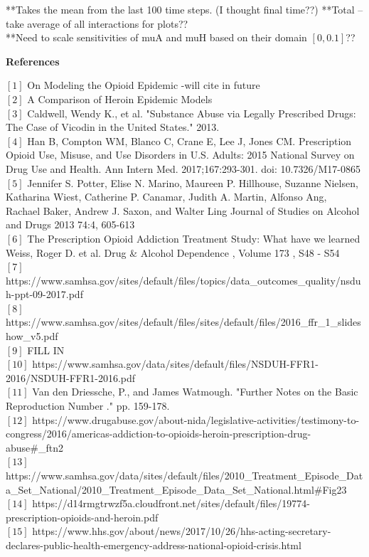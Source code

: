 \documentclass[12pt]{article}
\begin{document}
**Takes the mean from the last 100 time steps. (I thought final time??) 
**Total --take average of all interactions for plots?? \\
**Need to scale sensitivities of muA and muH based on their domain $[0,0.1]$??









\textbf{References}

$[1]$ On Modeling the Opioid Epidemic -will cite in future \\
$[2]$ A Comparison of Heroin Epidemic Models \\
$[3]$ Caldwell, Wendy K., et al. "Substance Abuse via Legally Prescribed Drugs: The Case of Vicodin in the United States." 2013. \\
$[4]$ Han B, Compton WM, Blanco C, Crane E, Lee J, Jones CM. Prescription Opioid Use, Misuse, and Use Disorders in U.S. Adults: 2015 National Survey on Drug Use and Health. Ann Intern Med. 2017;167:293-301. doi: 10.7326/M17-0865 \\
$[5]$  Jennifer S. Potter, Elise N. Marino, Maureen P. Hillhouse, Suzanne Nielsen, Katharina Wiest, Catherine P. Canamar, Judith A. Martin, Alfonso Ang, Rachael Baker, Andrew J. Saxon, and Walter Ling
Journal of Studies on Alcohol and Drugs 2013 74:4, 605-613 \\
$[6]$ The Prescription Opioid Addiction Treatment Study: What have we learned Weiss, Roger D. et al. Drug \& Alcohol Dependence , Volume 173 , S48 - S54\\
$[7]$ https://www.samhsa.gov/sites/default/files/topics/data\_outcomes\_quality/nsduh-ppt-09-2017.pdf \\
$[8]$ https://www.samhsa.gov/sites/default/files/sites/default/files/2016\_ffr\_1\_slideshow\_v5.pdf \\ 
$[9]$ FILL IN \\
$[10]$ https://www.samhsa.gov/data/sites/default/files/NSDUH-FFR1-2016/NSDUH-FFR1-2016.pdf \\
$[11]$ Van den Driessche, P., and James Watmough. "Further Notes on the Basic Reproduction Number ." pp. 159-178. \\
$[12]$ https://www.drugabuse.gov/about-nida/legislative-activities/testimony-to-congress/2016/americas-addiction-to-opioids-heroin-prescription-drug-abuse\#\_ftn2 \\
$[13]$ https://www.samhsa.gov/data/sites/default/files/2010\_Treatment\_Episode\_Data\_Set\_National/2010\_Treatment\_Episode\_Data\_Set\_National.html\#Fig23 \\
$[14]$ https://d14rmgtrwzf5a.cloudfront.net/sites/default/files/19774-prescription-opioids-and-heroin.pdf \\
$[15]$ https://www.hhs.gov/about/news/2017/10/26/hhs-acting-secretary-declares-public-health-emergency-address-national-opioid-crisis.html \\




 
\end{document}
